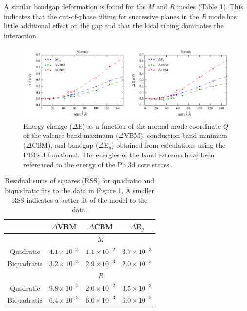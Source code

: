 A similar bandgap deformation is found for the \textit{M} and \textit{R} modes (Table \ref{RSS}). This indicates that the out-of-phase tilting for successive planes in the \textit{R} mode has little additional effect on the gap and that the local tilting dominates the interaction.

\begin{figure}[h]
\includegraphics[width=\textwidth]{figures/ch5/fig_s3.png}
\caption[Bandgap deformation potential]{\label{ch5figs1}
Energy change ($\Delta$E) as a function of the normal-mode coordinate $Q$ of the valence-band maximum ($\Delta$VBM), conduction-band minimum ($\Delta$CBM), and bandgap ($\Delta$E$_g$) obtained from calculations using the PBEsol functional.
The energies of the band extrema have been referenced to the energy of the Pb 3d core states.
}
\end{figure}

\begin{table}[ht] \centering
 \caption[Residual sum of squares for quadratic and bi-quadratic fits to calculated bandgaps] {Residual sums of squares (RSS) for quadratic and biquadratic fits to the data in Figure \ref{ch5figs1}. A smaller RSS indicates a better fit of the model to the data.}
  \label{RSS} 
 \begin{tabular}{cccc} 
 \toprule
 
  \multicolumn{1}{c}{} & $\Delta$VBM & $\Delta$CBM & $\Delta$E$_g$ \\
  \midrule
 \multicolumn{1}{c}{} & \multicolumn{3}{c}{$M$} \\

 Quadratic & $4.1 \times 10^{-3}$ & $ 1.1 \times 10^{-2}$ & $3.7 \times 10^{-3}$ \\

 Biquadratic & $3.2 \times 10^{-3}$ & $2.9 \times 10^{-3}$ & $2.0 \times 10^{-5}$ \\

 \midrule
 
  \multicolumn{1}{c}{} & \multicolumn{3}{c}{$R$} \\

 Quadratic &   $9.8 \times 10^{-3}$& $2.0 \times 10^{-2}$& $3.5 \times 10^{-3}$\\

 Biquadratic & $6.4 \times 10^{-3}$ &$6.0 \times 10^{-3}$ & $6.0 \times 10^{-5}$\\
 
 \bottomrule
 \end{tabular}
 \end{table}

